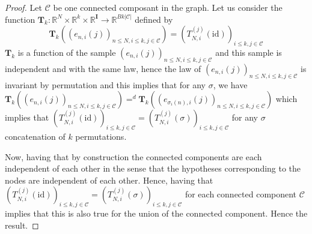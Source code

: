 \documentclass{article}
\theoremstyle{plain}
\theoremstyle{remark}
\newcommand{\R}{\mathbb{R}}
\newcommand{\1}{\mathbbm{1}}
\newcommand{\id}{\mathrm{id}}
\numberwithin{equation}{section}
\begin{document}
\begin{proof}
Let $\mathcal{C}$ be one connected composant in the graph. Let us consider the function $\textbf{T}_k : \R^{N}\times\R^k\times\R^{\textbf{I}}\to \R^{Bk|\mathcal{C}|}$ defined by $$\textbf{T}_k\left((e_{n,i}(j))_{n\le N, i\le k,j\in \mathcal{C}}\right) =(T_{N,i}^{(j)}(\id))_{i\le k, j \in \mathcal{C}}$$
$\textbf{T}_k$ is a function of the sample $(e_{n,i}(j))_{n\le N, i\le k,j\in \mathcal{C}}$ and this sample is independent and with the same law, hence the law of $(e_{n,i}(j))_{n\le N, i\le k,j\in \mathcal{C}}$ is invariant by permutation and this implies that for any $\sigma$, we have $\textbf{T}_k\left((e_{n,i}(j))_{n\le N, i\le k,j\in \mathcal{C}}\right) =^d \textbf{T}_k\left((e_{\sigma_i(n),i}(j))_{n\le N, i\le k,j\in \mathcal{C}}\right)$ which implies that $(T_{N,i}^{(j)}(\id))_{i\le k, j \in \mathcal{C}}=(T_{N,i}^{(j)}(\sigma))_{i\le k, j \in \mathcal{C}}$ for any $\sigma$ concatenation of $k$ permutations.

Now, having that by construction the connected components are each independent of each other in the sense that the hypotheses corresponding to the nodes are independent of each other. Hence, having that $(T_{N,i}^{(j)}(\id))_{i\le k, j \in \mathcal{C}}=(T_{N,i}^{(j)}(\sigma))_{i\le k, j \in \mathcal{C}}$ for each connected component $\mathcal{C}$ implies that this is also true for the union of the connected component. Hence the result.

\end{proof}
\end{document}
